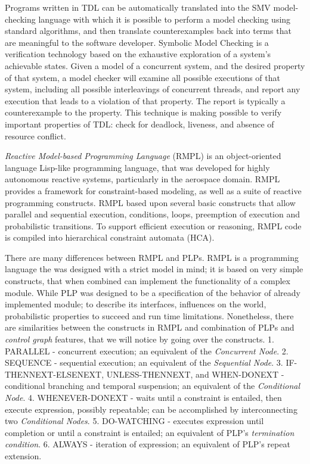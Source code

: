 \par Programs written in TDL can be automatically translated \cite{simmons2000towards} into the SMV \cite{burch1992symbolic} model-checking language with which it is possible to perform a model checking using standard algorithms, and then translate counterexamples back into terms that are meaningful to the software developer. Symbolic Model Checking is a verification technology based on the exhaustive exploration of a system’s achievable states. Given a model of a concurrent system, and the desired property of that system, a model checker will examine all possible executions of that system, including all possible interleavings of concurrent threads, and report any execution that leads to a violation of that property. The report is typically a counterexample to the property. This technique is making possible to verify important properties of TDL: check for deadlock, liveness, and absence of resource conflict.
\par \textit{Reactive Model-based Programming Language} (RMPL) \cite{ingham2001reactive} is an object-oriented language Lisp-like programming language, that was developed for highly autonomous reactive systems, particularly in the aerospace domain. RMPL provides a framework for constraint-based modeling, as well as a suite of reactive programming constructs. RMPL based upon several basic constructs that allow parallel and sequential execution, conditions, loops, preemption of execution and probabilistic transitions. To support efficient execution or reasoning, RMPL code is compiled into hierarchical constraint automata (HCA).
\par There are many differences between RMPL and PLPs. RMPL is a programming language the was designed with a strict model in mind; it is based on very simple constructs, that when combined can implement the functionality of a complex module. While PLP was designed to be a specification of the behavior of already implemented module; to describe its interfaces, influences on the world, probabilistic properties to succeed and run time limitations. Nonetheless, there are similarities between the constructs in RMPL and combination of PLPs and \textit{control graph} features, that we will notice by going over the constructs. 1. PARALLEL - concurrent execution; an equivalent of the \textit{Concurrent Node}. 2. SEQUENCE - sequential execution; an equivalent of the \textit{Sequential Node}. 3. IF-THENNEXT-ELSENEXT, UNLESS-THENNEXT, and WHEN-DONEXT - conditional branching and temporal suspension; an equivalent of the \textit{Conditional Node}. 4. WHENEVER-DONEXT - waits until a constraint is entailed, then execute expression, possibly repeatable; can be accomplished by interconnecting two \textit{Conditional Nodes}. 5. DO-WATCHING - executes expression until completion or until a constraint is entailed; an equivalent of PLP’s \textit{termination condition}. 6. ALWAYS - iteration of expression; an equivalent of PLP’s repeat extension.
